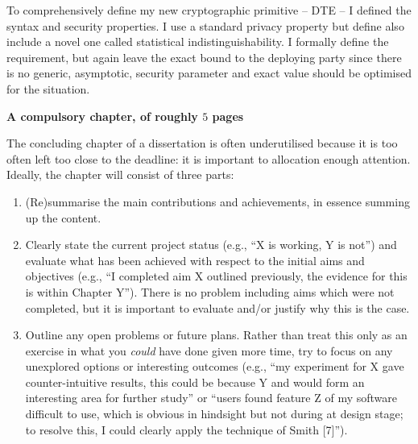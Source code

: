 \documentclass[ %
                    author={Samuel Russell},
                supervisor={Prof. Bogdan Warinschi},
                    degree={MEng},
                     title={Innocuous Ciphertexts},
                  subtitle={The DE-CENSOR Scheme},
                      type={Research},
                      year={2018} ]{dissertation}
\begin{document}
To comprehensively define my new cryptographic primitive -- DTE -- I defined the syntax and security properties.
I use a standard privacy property but define also include a novel one called statistical indistinguishability. I formally define the requirement, but again leave the exact bound to the deploying party since there is no generic, asymptotic, security parameter and exact value should be optimised for the situation.



\vspace{2cm}
{\bf A compulsory chapter,     of roughly $5$ pages}
\vspace{1cm}

\noindent
The concluding chapter of a dissertation is often underutilised because it
is too often left too close to the deadline: it is important to allocation
enough attention.  Ideally, the chapter will consist of three parts:

\begin{enumerate}
\item (Re)summarise the main contributions and achievements, in essence
      summing up the content.
\item Clearly state the current project status (e.g., ``X is working, Y
      is not'') and evaluate what has been achieved with respect to the
      initial aims and objectives (e.g., ``I completed aim X outlined
      previously, the evidence for this is within Chapter Y'').  There
      is no problem including aims which were not completed, but it is
      important to evaluate and/or justify why this is the case.
\item Outline any open problems or future plans.  Rather than treat this
      only as an exercise in what you {\em could} have done given more
      time, try to focus on any unexplored options or interesting outcomes
      (e.g., ``my experiment for X gave counter-intuitive results, this
      could be because Y and would form an interesting area for further
      study'' or ``users found feature Z of my software difficult to use,
      which is obvious in hindsight but not during at design stage; to
      resolve this, I could clearly apply the technique of Smith [7]'').
\end{enumerate}


%
%
\end{document}
